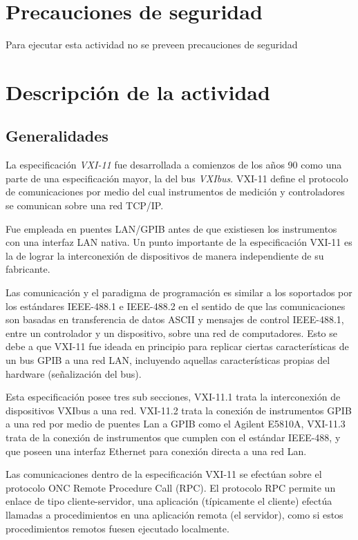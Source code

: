 \documentclass[paper=letter,oneside,fontsize=11pt, parskip=full]{scrartcl}
\begin{document}
	\section{Precauciones de seguridad}
	
		Para ejecutar esta actividad no se preveen precauciones de seguridad
		
	\section{Descripción de la actividad}
	
		\subsection{Generalidades}		

		La especificación \emph{VXI-11} fue desarrollada a comienzos de los años 90 como una parte de una especificación mayor, la del bus \emph{VXIbus}. VXI-11 define el protocolo de comunicaciones por medio del cual instrumentos de medición y controladores se comunican sobre una red TCP/IP. 
		
		Fue empleada en puentes LAN/GPIB antes de que existiesen los instrumentos con una interfaz LAN nativa. Un punto importante de la especificación VXI-11 es la de lograr la interconexión de dispositivos de manera independiente de su fabricante.			
		
		Las comunicación y el paradigma de  programación es similar a los soportados por los estándares IEEE-488.1 e IEEE-488.2 en el sentido de que las comunicaciones son basadas en transferencia de datos ASCII y mensajes de control IEEE-488.1, entre un controlador y un dispositivo, sobre una red de computadores. Esto se debe a que	VXI-11 fue ideada en principio para replicar ciertas características de un bus GPIB a una red LAN, incluyendo aquellas características propias del hardware (señalización del bus). 
				
		Esta especificación posee tres sub secciones, VXI-11.1 trata la interconexión de dispositivos VXIbus a una red. VXI-11.2 trata la conexión de instrumentos GPIB a una red por medio de puentes Lan a GPIB como el Agilent E5810A, VXI-11.3 trata de la conexión de instrumentos que cumplen con el estándar IEEE-488, y que poseen una interfaz Ethernet para conexión directa a una red Lan.
		
		Las comunicaciones dentro de la especificación VXI-11 se efectúan sobre el protocolo ONC Remote Procedure Call (RPC). El protocolo  RPC permite un enlace de tipo cliente-servidor, una aplicación (típicamente el cliente) efectúa llamadas a procedimientos en una aplicación remota (el servidor), como si estos procedimientos remotos fuesen ejecutado localmente. 
		
\end{document}
